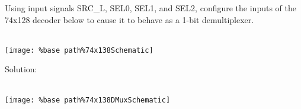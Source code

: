 Using input signals SRC\_L, SEL0, SEL1, and SEL2, configure the inputs of the 74x128 decoder below to cause it to behave as a 1-bit demultiplexer.\\ \\
\begin{center}
  \texttt{[image: \%base path\%74x138Schematic]}
\end{center}

Solution: \\ \\
\begin{center}
  \texttt{[image: \%base path\%74x138DMuxSchematic]}
\end{center}
